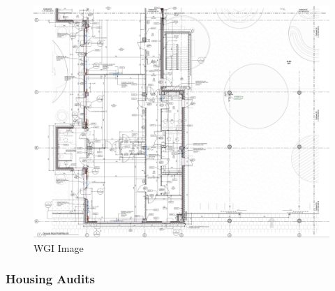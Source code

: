 \documentclass[
]{article}
\begin{document}
\begin{figure}[H]

{\centering \includegraphics{assets/WGI/WGI-SevenKingsPartPlan.jpg}

}

\caption{WGI Image}

\end{figure}%

\subsubsection{Housing Audits}\label{housing-audits}
\end{document}
